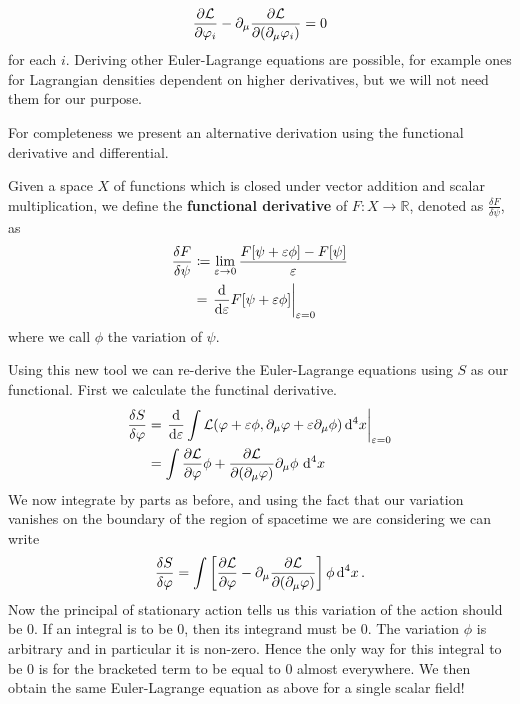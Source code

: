 \begin{equation}\label{eq:ELfieldsMul}
\pdv{\mathcal{L}}{\varphi_i} - \partial_\mu \pdv{\mathcal{L}}{(\partial_\mu\varphi_i)} = 0
\end{equation}
for each $i$. Deriving other Euler-Lagrange equations are possible, for example ones for Lagrangian densities dependent on higher derivatives, but we will not need them for our purpose.

For completeness we present an alternative derivation using the functional derivative and differential.
\begin{definition}\label{funcD}
Given a space $X$ of functions which is closed under vector addition and scalar multiplication, we define the \textbf{functional derivative} of $F:X\to \mathbb{R}$, denoted as $\frac{\delta F}{\delta \psi}$, as
\begin{align}
\frac{\delta F}{\delta \psi} & \coloneqq \lim_{\varepsilon\to 0}\frac{F[\psi + \varepsilon\phi] - F[\psi]}{\varepsilon} \nonumber \\
 & = \left.\dv{\varepsilon} F[\psi + \varepsilon\phi]\right|_{\varepsilon = 0}
\end{align}
where we call $\phi$ the variation of $\psi$.
\end{definition}


Using this new tool we can re-derive the Euler-Lagrange equations using $S$ as our functional. First we calculate the functinal derivative.
\begin{align*}
\fdv{S}{\varphi} & = \left.\dv{\varepsilon}\int\lag(\varphi + \varepsilon\phi, \partial_\mu\varphi + \varepsilon\partial_\mu\phi)\dd[4]{x}\right|_{\varepsilon = 0} \\
 & = \int \pdv{\lag}{\varphi}\phi + \pdv{\lag}{(\partial_\mu\varphi)}\partial_\mu\phi\,\dd[4]{x}
\end{align*}
We now integrate by parts as before, and using the fact that our variation vanishes on the boundary of the region of spacetime we are considering we can write
\begin{equation}
\fdv{S}{\varphi} = \int \left[\pdv{\lag}{\varphi} - \partial_\mu \pdv{\lag}{(\partial_\mu\varphi)}\right]\phi\dd[4]{x}.
\end{equation}
Now the principal of stationary action tells us this variation of the action should be 0. If an integral is to be 0, then its integrand must be 0. The variation $\phi$ is arbitrary and in particular it is non-zero. Hence the only way for this integral to be 0 is for the bracketed term to be equal to 0 almost everywhere. We then obtain the same Euler-Lagrange equation as above for a single scalar field!

